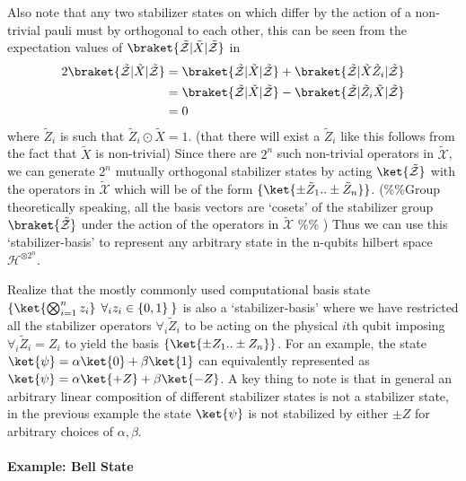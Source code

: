 \documentclass[
]{article}
\begin{document}
Also note that any two stabilizer states on which differ by the action
of a non-trivial pauli must by orthogonal to each other, this can be
seen from the expectation values of
\(\braket{\tilde{\mathcal{Z}}| \tilde{X}|\tilde{\mathcal{Z}}}\) in
\[\begin{align} 2\braket{\tilde{\mathcal{Z}}| \tilde{X}|\tilde{\mathcal{Z}}} &= \braket{\tilde{\mathcal{Z}}| \tilde{X}|\tilde{\mathcal{Z}}} +\braket{\tilde{\mathcal{Z}}| \tilde{X}\tilde{Z}_i|\tilde{\mathcal{Z}}} \\ &= \braket{\tilde{\mathcal{Z}}| \tilde{X}|\tilde{\mathcal{Z}}} -\braket{\tilde{\mathcal{Z}}| \tilde{Z}_i\tilde{X}|\tilde{\mathcal{Z}}} \\ &= 0\end{align}\]where
\(\tilde{Z}_i\) is such that \(\tilde{Z}_{i}\odot \tilde{X}=1\). (that
there will exist a \(\tilde{Z}_i\) like this follows from the fact that
\(\tilde{X}\) is non-trivial) Since there are \(2^{n}\) such non-trivial
operators in \(\tilde{\mathcal{X}}\), we can generate \(2^n\) mutually
orthogonal stabilizer states by acting \(\ket{\mathcal{\tilde{Z}}}\)
with the operators in \(\tilde{\mathcal{X}}\) which will be of the form
\(\{\ket{\pm \tilde{Z}_{1} ..\pm \tilde{Z}_{n}}\}\). (\%\%Group
theoretically speaking, all the basis vectors are `cosets' of the
stabilizer group \(\braket{\mathcal{\tilde{Z}}}\) under the action of
the operators in \(\mathcal{\tilde{X}}\) \%\% ) Thus we can use this
`stabilizer-basis' to represent any arbitrary state in the n-qubits
hilbert space \(\mathcal{H}^{\otimes2^n}\).

Realize that the mostly commonly used computational basis state
\(\{ \ket{\bigotimes_{i=1}^{n} z_{i}} \:\: \forall_{i}z_{i} \in \{0,1\} \: \}\)
is also a `stabilizer-basis' where we have restricted all the stabilizer
operators \(\forall_{i} \tilde{Z}_{i}\) to be acting on the physical
\(i\)th qubit imposing \(\forall_{i} \tilde{Z}_{i} = Z_{i}\) to yield
the basis \(\{\ket{\pm Z_{1}.. \pm Z_n}\}\). For an example, the state
\(\ket{\psi} = \alpha \ket{0} + \beta \ket{1}\) can equivalently
represented as \(\ket{\psi} = \alpha \ket{+Z} + \beta \ket{-Z}\). A key
thing to note is that in general an arbitrary linear composition of
different stabilizer states is not a stabilizer state, in the previous
example the state \(\ket{\psi}\) is not stabilized by either \(\pm Z\)
for arbitrary choices of \(\alpha, \beta\).

\hypertarget{example-bell-state}{%
\paragraph{Example: Bell State}\label{example-bell-state}}
\end{document}
